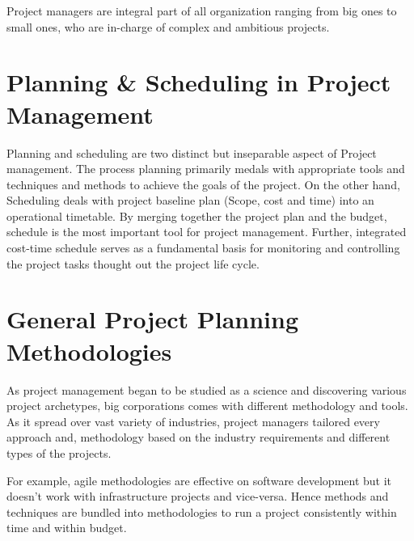 Project managers are integral part of all organization ranging from big ones to small ones, who are in-charge of complex and ambitious projects.

 \section{Planning \& Scheduling in Project Management}
 \label{sec:sec002}
 
 Planning and scheduling are two distinct but inseparable aspect of Project management. The process planning primarily medals with appropriate tools and techniques and methods to achieve the goals of the project. On the other hand, Scheduling deals with project baseline plan (Scope, cost and time) into an operational timetable. By merging together the project plan and the budget, schedule is the most important tool for project management. Further, integrated cost-time schedule serves as a fundamental basis for monitoring and controlling the project tasks thought out the project life cycle.


\clearpage



\section{General Project Planning Methodologies}
 \label{sec:sec003}
 
 As project management began to be studied as a science and discovering various project archetypes, big corporations comes with different methodology and tools. As it spread over vast variety of industries, project managers tailored every approach and, methodology based on the industry requirements and different types of the projects.

For example, agile methodologies are effective on software development but it doesn’t work with infrastructure projects and vice-versa. Hence methods and techniques are bundled into methodologies to run a project consistently within time and within budget.

